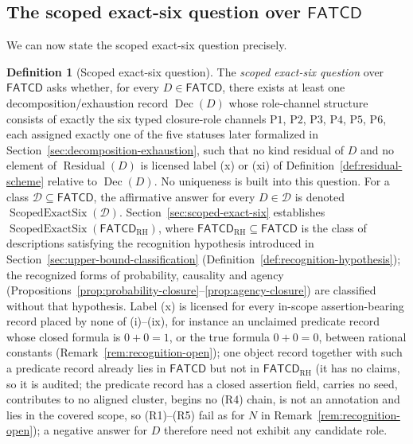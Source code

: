 \documentclass[11pt]{article}
\theoremstyle{definition}
\newtheorem{definition}[theorem]{Definition}
\newcommand{\FATCD}{\ensuremath{\mathsf{FATCD}}}
\newcommand{\Dec}[1]{\ensuremath{\operatorname{Dec}\!\left(#1\right)}}
\newcommand{\Residual}[1]{\ensuremath{\operatorname{Residual}\!\left(#1\right)}}
\newcommand{\ScopedExactSix}[1]{\ensuremath{\operatorname{ScopedExactSix}\!\left(#1\right)}}
\newcommand{\Pone}{\ensuremath{\mathrm{P1}}}
\newcommand{\Ptwo}{\ensuremath{\mathrm{P2}}}
\newcommand{\Pthree}{\ensuremath{\mathrm{P3}}}
\newcommand{\Pfour}{\ensuremath{\mathrm{P4}}}
\newcommand{\Pfive}{\ensuremath{\mathrm{P5}}}
\newcommand{\Psix}{\ensuremath{\mathrm{P6}}}
\begin{document}
\subsection{The scoped exact-six question over \FATCD{}}\label{subsec:scoped-exact-six-question}

We can now state the scoped exact-six question precisely.

\begin{definition}[Scoped exact-six question]\label{def:scoped-exact-six-question}
The \emph{scoped exact-six question} over \FATCD{} asks whether, for every
\(D \in \FATCD{}\), there exists at least one decomposition/exhaustion record
\(\Dec{D}\) whose role-channel structure consists of exactly the six typed
closure-role channels \Pone{}, \Ptwo{}, \Pthree{}, \Pfour{}, \Pfive{},
\Psix{}, each assigned exactly one of the five statuses later formalized in
Section~\ref{sec:decomposition-exhaustion}, such that no kind residual of
\(D\) and no element of \(\Residual{D}\) is licensed label (x) or (xi) of
Definition~\ref{def:residual-scheme} relative to \(\Dec{D}\). No uniqueness is built into this
question. For a class \(\mathcal D\subseteq\FATCD{}\), the affirmative answer
for every \(D\in\mathcal D\) is denoted \(\ScopedExactSix{\mathcal D}\).
Section~\ref{sec:scoped-exact-six} establishes \(\ScopedExactSix{\FATCD_{\mathrm{RH}}}\),
where \(\FATCD_{\mathrm{RH}}\subseteq\FATCD{}\) is the class of descriptions
satisfying the recognition hypothesis introduced in
Section~\ref{sec:upper-bound-classification}
(Definition~\ref{def:recognition-hypothesis}); the recognized forms of
probability, causality and agency
(Propositions~\ref{prop:probability-closure}--\ref{prop:agency-closure}) are
classified without that hypothesis. Label (x) is licensed for every in-scope
assertion-bearing record placed by none of (i)--(ix), for instance an unclaimed
predicate record whose closed formula is \(0+0=1\), or the true formula \(0+0=0\), between rational constants (Remark~\ref{rem:recognition-open}); one object record together with such a predicate record already lies in \FATCD{} but not in \(\FATCD_{\mathrm{RH}}\) (it has no claims, so it is audited; the predicate record has a closed assertion field, carries no seed, contributes to no aligned cluster, begins no (R4) chain, is not an annotation and lies in the covered scope, so (R1)--(R5) fail as for \(N\) in Remark~\ref{rem:recognition-open});
a negative answer for \(D\) therefore need not exhibit any candidate role.
\end{definition}
\end{document}
